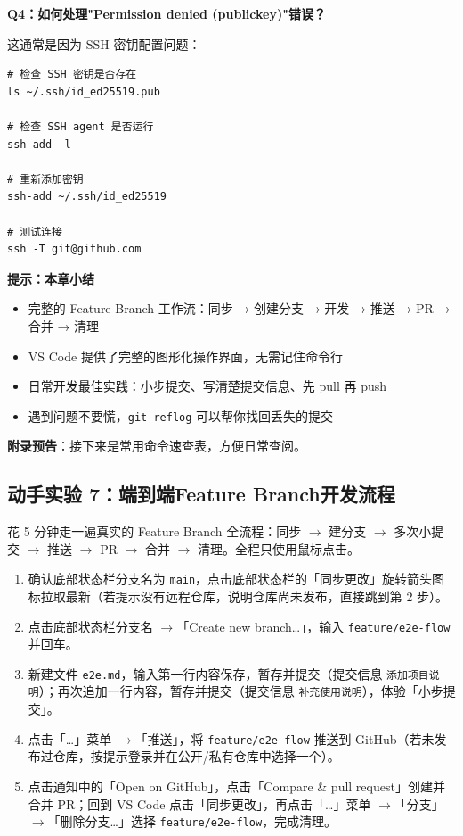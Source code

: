 \documentclass[12pt,a4paper,openany]{ctexbook}
\begin{document}
\medskip
\textbf{Q4：如何处理"Permission denied (publickey)"错误？}

这通常是因为 SSH 密钥配置问题：

\begin{lstlisting}[style=shell]
# 检查 SSH 密钥是否存在
ls ~/.ssh/id_ed25519.pub

# 检查 SSH agent 是否运行
ssh-add -l

# 重新添加密钥
ssh-add ~/.ssh/id_ed25519

# 测试连接
ssh -T git@github.com
\end{lstlisting}
\medskip

\noindent\textbf{提示：}\textbf{本章小结}
\begin{itemize}
  \item 完整的 Feature Branch 工作流：同步 → 创建分支 → 开发 → 推送 → PR → 合并 → 清理
  \item VS Code 提供了完整的图形化操作界面，无需记住命令行
  \item 日常开发最佳实践：小步提交、写清楚提交信息、先 pull 再 push
  \item 遇到问题不要慌，\texttt{git reflog} 可以帮你找回丢失的提交
\end{itemize}

\textbf{附录预告}：接下来是常用命令速查表，方便日常查阅。

\subsection*{动手实验 7：端到端Feature Branch开发流程}

花 5 分钟走一遍真实的 Feature Branch 全流程：同步 $\to$ 建分支 $\to$ 多次小提交 $\to$ 推送 $\to$ PR $\to$ 合并 $\to$ 清理。全程只使用鼠标点击。

\medskip
\begin{enumerate}[leftmargin=1.5em]
  \item 确认底部状态栏分支名为 \texttt{main}，点击底部状态栏的「同步更改」旋转箭头图标拉取最新（若提示没有远程仓库，说明仓库尚未发布，直接跳到第 2 步）。
  \item 点击底部状态栏分支名 $\to$「Create new branch…」，输入 \texttt{feature/e2e-flow} 并回车。
  \item 新建文件 \texttt{e2e.md}，输入第一行内容保存，暂存并提交（提交信息 \texttt{添加项目说明}）；再次追加一行内容，暂存并提交（提交信息 \texttt{补充使用说明}），体验「小步提交」。
  \item 点击「…」菜单 $\to$「推送」，将 \texttt{feature/e2e-flow} 推送到 GitHub（若未发布过仓库，按提示登录并在公开/私有仓库中选择一个）。
  \item 点击通知中的「Open on GitHub」，点击「Compare \& pull request」创建并合并 PR；回到 VS Code 点击「同步更改」，再点击「…」菜单 $\to$「分支」$\to$「删除分支…」选择 \texttt{feature/e2e-flow}，完成清理。
\end{enumerate}
\medskip
\end{document}
